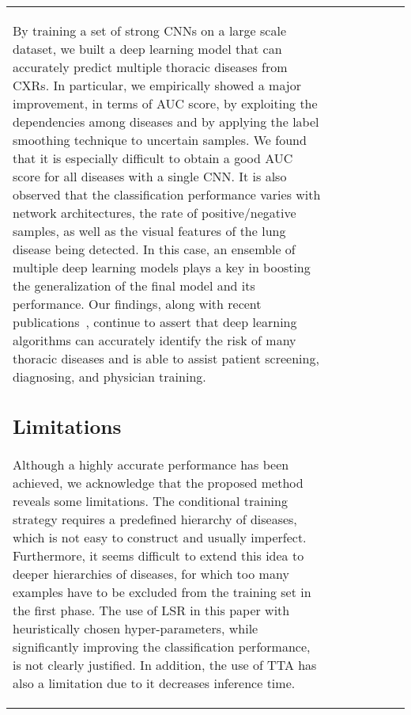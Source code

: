 \documentclass[review]{elsarticle}
\begin{document}
\begin{frontmatter}
{\begin{table}
\begin{tabular}{p{2.25cm}p{1.3cm}p{1.3cm}p{1.2cm}p{1.2cm}p{1.3cm}p{0.9cm}}
By training a set of strong CNNs on a large scale dataset, we built a deep learning model that can accurately predict multiple thoracic diseases from CXRs. In particular, we empirically showed a major improvement, in terms of AUC score, by exploiting the dependencies among diseases and by applying the label smoothing technique to uncertain samples. We found that it is especially difficult to obtain a good AUC score for all diseases with a single CNN. It is also observed that the classification performance varies with network architectures, the rate of positive/negative samples, as well as the visual features of the lung disease being detected. 
In this case, an ensemble of multiple deep learning models plays a key in boosting the generalization of the final model and its performance. Our findings, along with recent publications~\cite{rajpurkar2017chexnet,guan2018diagnose,rajpurkar2018deep,kumar2018boosted}, continue to assert that deep learning algorithms can accurately identify the risk of many thoracic diseases and is able  to assist patient screening, diagnosing, and physician training.

\subsection{Limitations}
Although a highly accurate performance has been achieved, we acknowledge that the proposed method reveals some limitations. The conditional training strategy requires a predefined hierarchy of diseases, which is not easy to construct and usually imperfect. Furthermore, it seems difficult to extend this idea to deeper hierarchies of diseases, for which too many examples have to be excluded from the training set in the first phase. The use of LSR in this paper with heuristically chosen hyper-parameters, while significantly improving the classification performance, is not clearly justified. In addition, the use of TTA has also a limitation due to it decreases inference time.


\end{tabular}
\end{table}}
\end{frontmatter}
\end{document}
